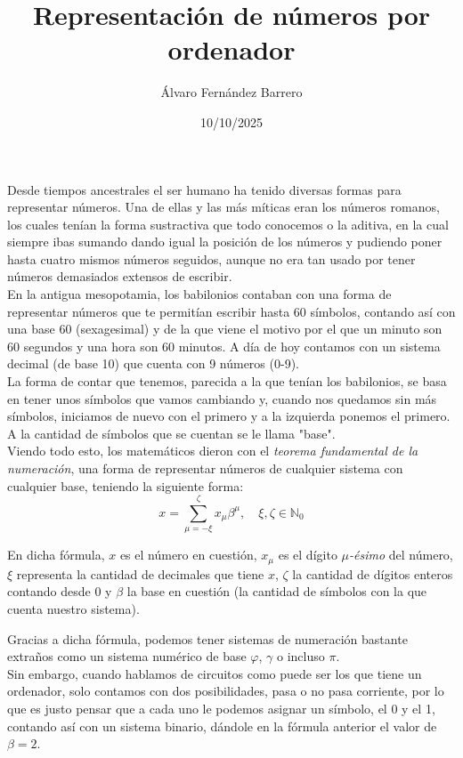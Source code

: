 \documentclass[12pt]{article}
\title{Representación de números por ordenador}
\author{Álvaro Fernández Barrero}
\date{10/10/2025}
\begin{document}
\maketitle

Desde tiempos ancestrales el ser humano ha tenido diversas formas para representar números. Una de ellas y las más  míticas eran los números romanos, los cuales tenían la forma sustractiva que todo conocemos o la aditiva, en la cual siempre ibas sumando dando igual la posición de los números y pudiendo poner hasta cuatro mismos números seguidos, aunque no era tan usado por tener números demasiados extensos de escribir.
\\

En la antigua mesopotamia, los babilonios contaban con una forma de representar números que te permitían escribir hasta 60 símbolos, contando así con una base 60 (sexagesimal) y de la que viene el motivo por el que un minuto son 60 segundos y una hora son 60 minutos. A día de hoy contamos con un sistema decimal (de base 10) que cuenta con 9 números (0-9).
\\

La forma de contar que tenemos, parecida a la que tenían los babilonios, se basa en tener unos símbolos que vamos cambiando y, cuando nos quedamos sin más símbolos, iniciamos de nuevo con el primero y a la izquierda ponemos el primero. A la cantidad de símbolos que se cuentan se le llama "base".
\\

Viendo todo esto, los matemáticos dieron con el \emph{teorema fundamental de la numeración}, una forma de representar números de cualquier sistema con cualquier base, teniendo la siguiente forma:
\[
     x = \sum_{\mu=-\xi}^{\zeta}x_{\mu}\beta^{\mu}, \quad \xi,\zeta \in \mathbb{N}_0
\]

En dicha fórmula, \(x\) es el número en cuestión, \(x_\mu\) es el dígito \emph{\(\mu\)-ésimo} del número, \(\xi\) representa la cantidad de decimales que tiene \(x\), \(\zeta\) la cantidad de dígitos enteros contando desde 0 y \(\beta\) la base en cuestión (la cantidad de símbolos con la que cuenta nuestro sistema).

Gracias a dicha fórmula, podemos tener sistemas de numeración bastante extraños como un sistema numérico de base \(\varphi\), \(\gamma\) o incluso \(\pi\). 
\\

Sin embargo, cuando hablamos de circuitos como puede ser los que tiene un ordenador, solo contamos con dos posibilidades, pasa o no pasa corriente, por lo que es justo pensar que a cada uno le podemos asignar un símbolo, el 0 y el 1, contando así con un sistema binario, dándole en la fórmula anterior el valor de \(\beta=2\).
\\
\end{document}
